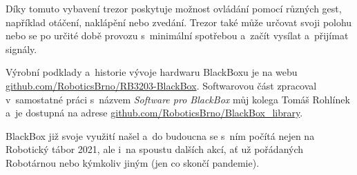 Díky tomuto vybavení trezor poskytuje možnost 
ovládání pomocí různých gest, například otáčení, naklápění nebo zvedání. 
Trezor také může určovat svoji polohu nebo se po určité době 
provozu s~minimální spotřebou  a~začít vysílat a~přijímat signály.

Výrobní podklady a~historie vývoje hardwaru BlackBoxu je na webu 
\href{https://github.com/RoboticsBrno/RB3203-BlackBox}{github.com/RoboticsBrno/RB3203-BlackBox}.
Softwarovou část zpracoval v~samostatné práci s~názvem \textit{Software pro BlackBox} můj kolega Tomáš Rohlínek 
a~je dostupná na adrese 
\href{https://github.com/RoboticsBrno/BlackBox_library}{github.com/RoboticsBrno/BlackBox\_library}.

BlackBox již svoje využití našel a~do budoucna se s~ním počítá nejen na Robotický tábor 2021, 
ale i~na spoustu dalších akcí, ať už pořádaných Robotárnou nebo kýmkoliv jiným  (jen co skončí pandemie). 



